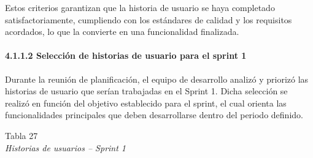 \documentclass[12pt,a4paper,oneside]{report}
\begin{document}
Estos criterios garantizan que la historia de usuario se haya completado
satisfactoriamente, cumpliendo con los estándares de calidad y los
requisitos acordados, lo que la convierte en una funcionalidad
finalizada.

\paragraph{4.1.1.2 Selección de historias de usuario para el sprint
1}\label{selecciuxf3n-de-historias-de-usuario-para-el-sprint-1}

Durante la reunión de planificación, el equipo de desarrollo analizó y
priorizó las historias de usuario que serían trabajadas en el Sprint 1.
Dicha selección se realizó en función del objetivo establecido para el
sprint, el cual orienta las funcionalidades principales que deben
desarrollarse dentro del periodo definido.

\label{_Toc231672282}{}Tabla 27\\
\emph{Historias de usuarios -- Sprint 1}
\end{document}
